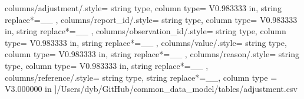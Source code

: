 \begin{landscape}
    columns/adjustment/.style={
            string type, 
            column type= V{0.983333 in}, 
            string replace*={_}{\_}
        },
    columns/report_id/.style={
            string type, 
            column type= V{0.983333 in}, 
            string replace*={_}{\_}
        },
    columns/observation_id/.style={
            string type, 
            column type= V{0.983333 in}, 
            string replace*={_}{\_}
        },
    columns/value/.style={
            string type, 
            column type= V{0.983333 in}, 
            string replace*={_}{\_}
        },
    columns/reason/.style={
            string type, 
            column type= V{0.983333 in}, 
            string replace*={_}{\_}
        },
    columns/reference/.style={
            string type, 
            string replace*={_}{\_},
            column type = V{3.000000 in}
        }
    ]{/Users/dyb/GitHub/common_data_model/tables/adjustment.csv}
\end{landscape}
